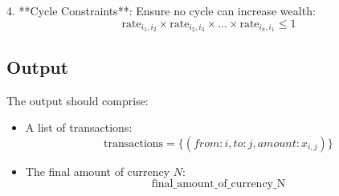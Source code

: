 \documentclass{article}
\begin{document}
4. **Cycle Constraints**:
   Ensure no cycle can increase wealth:
   \[
   \text{rate}_{i_1,i_2} \times \text{rate}_{i_2,i_3} \times \ldots \times \text{rate}_{i_k,i_1} \leq 1
   \]

\subsection*{Output}
The output should comprise:
\begin{itemize}
    \item A list of transactions:
    \[
    \text{transactions} = \{(from: i, to: j, amount: x_{i,j})\}
    \]
    \item The final amount of currency \( N \):
    \[
    \text{final\_amount\_of\_currency\_N}
    \]
\end{itemize}
\end{document}
